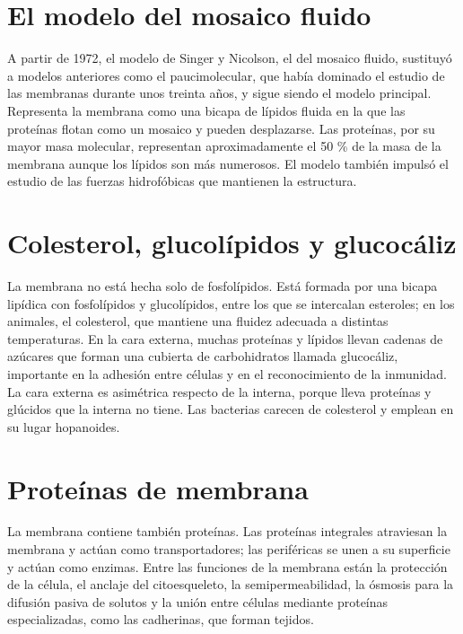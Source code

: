\documentclass{book}
\begin{document}
\section{El modelo del mosaico fluido}

A partir de 1972, el modelo de Singer y Nicolson, el del mosaico fluido, sustituyó a modelos anteriores como el paucimolecular, que había dominado el estudio de las membranas durante unos treinta años, y sigue siendo el modelo principal. Representa la membrana como una bicapa de lípidos fluida en la que las proteínas flotan como un mosaico y pueden desplazarse. Las proteínas, por su mayor masa molecular, representan aproximadamente el 50 \% de la masa de la membrana aunque los lípidos son más numerosos. El modelo también impulsó el estudio de las fuerzas hidrofóbicas que mantienen la estructura.


\section{Colesterol, glucolípidos y glucocáliz}

La membrana no está hecha solo de fosfolípidos. Está formada por una bicapa lipídica con fosfolípidos y glucolípidos, entre los que se intercalan esteroles; en los animales, el colesterol, que mantiene una fluidez adecuada a distintas temperaturas. En la cara externa, muchas proteínas y lípidos llevan cadenas de azúcares que forman una cubierta de carbohidratos llamada glucocáliz, importante en la adhesión entre células y en el reconocimiento de la inmunidad. La cara externa es asimétrica respecto de la interna, porque lleva proteínas y glúcidos que la interna no tiene. Las bacterias carecen de colesterol y emplean en su lugar hopanoides.


\section{Proteínas de membrana}

La membrana contiene también proteínas. Las proteínas integrales atraviesan la membrana y actúan como transportadores; las periféricas se unen a su superficie y actúan como enzimas. Entre las funciones de la membrana están la protección de la célula, el anclaje del citoesqueleto, la semipermeabilidad, la ósmosis para la difusión pasiva de solutos y la unión entre células mediante proteínas especializadas, como las cadherinas, que forman tejidos.
\end{document}
